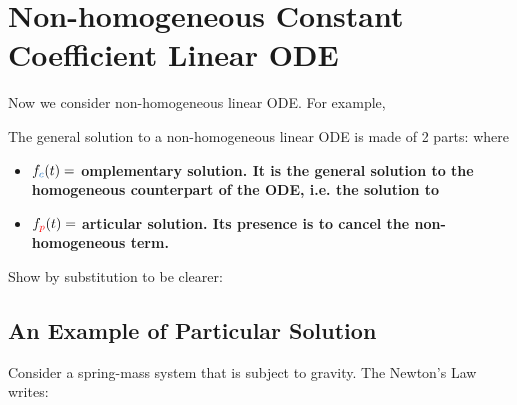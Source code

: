 \documentclass[class=article, crop=false, 12pt]{standalone}
\begin{document}


\linesep
\section{Non-homogeneous Constant Coefficient Linear ODE}

Now we consider non-homogeneous linear ODE. For example,

The general solution to a non-homogeneous linear ODE is made of 2 parts:
where
\begin{itemize}
    \item $f_\blue{c}(t) =$ \bf{omplementary solution}. 
    It is the general solution to the homogeneous counterpart of the ODE, 
    i.e. the solution to

    \item $f_{\color{red}{p}}(t) =$ \bf{articular solution}. 
    Its presence is to cancel the non-homogeneous term. 
\end{itemize}

Show by substitution to be clearer:

\subsection{An Example of Particular Solution}

Consider a spring-mass system that is subject to gravity. 
The Newton's  Law writes:
\end{document}
